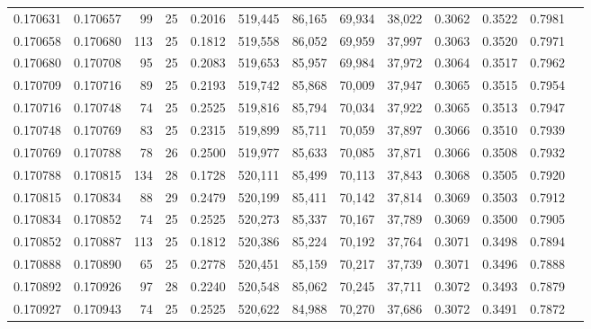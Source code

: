 \begin{tabular}{rrrrrrrrrrrrr}
0.170631 & 0.170657 &  99 &  25 &                                     0.2016 & 519,445 &  86,165 &  69,934 &  38,022 & 0.3062 & 0.3522 & 0.7981 \\
0.170658 & 0.170680 & 113 &  25 &                                     0.1812 & 519,558 &  86,052 &  69,959 &  37,997 & 0.3063 & 0.3520 & 0.7971 \\
0.170680 & 0.170708 &  95 &  25 &                                     0.2083 & 519,653 &  85,957 &  69,984 &  37,972 & 0.3064 & 0.3517 & 0.7962 \\
0.170709 & 0.170716 &  89 &  25 &                                     0.2193 & 519,742 &  85,868 &  70,009 &  37,947 & 0.3065 & 0.3515 & 0.7954 \\
0.170716 & 0.170748 &  74 &  25 &                                     0.2525 & 519,816 &  85,794 &  70,034 &  37,922 & 0.3065 & 0.3513 & 0.7947 \\
0.170748 & 0.170769 &  83 &  25 &                                     0.2315 & 519,899 &  85,711 &  70,059 &  37,897 & 0.3066 & 0.3510 & 0.7939 \\
0.170769 & 0.170788 &  78 &  26 &                                     0.2500 & 519,977 &  85,633 &  70,085 &  37,871 & 0.3066 & 0.3508 & 0.7932 \\
0.170788 & 0.170815 & 134 &  28 &                                     0.1728 & 520,111 &  85,499 &  70,113 &  37,843 & 0.3068 & 0.3505 & 0.7920 \\
0.170815 & 0.170834 &  88 &  29 &                                     0.2479 & 520,199 &  85,411 &  70,142 &  37,814 & 0.3069 & 0.3503 & 0.7912 \\
0.170834 & 0.170852 &  74 &  25 &                                     0.2525 & 520,273 &  85,337 &  70,167 &  37,789 & 0.3069 & 0.3500 & 0.7905 \\
0.170852 & 0.170887 & 113 &  25 &                                     0.1812 & 520,386 &  85,224 &  70,192 &  37,764 & 0.3071 & 0.3498 & 0.7894 \\
0.170888 & 0.170890 &  65 &  25 &                                     0.2778 & 520,451 &  85,159 &  70,217 &  37,739 & 0.3071 & 0.3496 & 0.7888 \\
0.170892 & 0.170926 &  97 &  28 &                                     0.2240 & 520,548 &  85,062 &  70,245 &  37,711 & 0.3072 & 0.3493 & 0.7879 \\
0.170927 & 0.170943 &  74 &  25 &                                     0.2525 & 520,622 &  84,988 &  70,270 &  37,686 & 0.3072 & 0.3491 & 0.7872 \\

\end{tabular}
